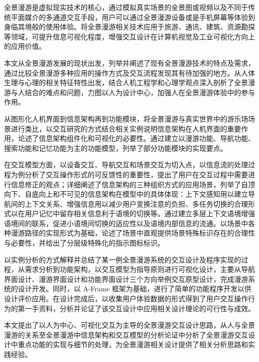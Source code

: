 \begin{cnabstract}
\begin{spacing}{1.0}
\xiaosi
\setlength{\baselineskip}{20pt}
全景漫游是虚拟现实技术的核心，通过模拟真实场景的全景图或视频以及不同于传统平面媒介的多通道交互手段，用户可以通过全景漫游设备或是手机屏幕等体验到身临其境般的使用体验。将全景漫游相关技术应用于旅游、通讯、建筑、资源勘探等领域，可提升信息可视化程度，增强交互设计在计算机视觉及工业可视化方向上的应用价值。

本文从全景漫游发展的现状出发，列举并阐述了现有全景漫游技术的特点及需求，通过比较全景漫游多种应用的操作方式及交互流程发现其有待加强的地方。从人体生理与心理的相关特征特性出发，结合人机工程学和心理学观点深入剖析了全景漫游与人结合的难点和问题，力图以人为设计中心，加强人在全景漫游体验中的参与作用。

从图形化人机界面到信息架构再到功能模块，将全景漫游与真实世界中的游乐场场景进行类比，以交互研究的方式结合相关实例说明信息架构在人机界面的重要作用，论述了信息架构组件化和可视化的必要性。通过建立以漫游功能、导航功能、搜索功能和记忆功能为主的功能模型，列举了部分功能模块的实现要点。

在交互模型方面，以设备交互、导航交互和场景交互为切入点，以信息流的处理过程为例分析了交互操作形式的可反馈性的重要性，提出了用户在交互过程中需要进行信息修正的观点；详细阐述了信息架构的三种组织方式的应用场景，列举了自顶向下、自底向上和不可见的信息架构在模型中的具体体现：上下文感知用以建立导航间的上下文关系、增强信息用以减少用户变换注意的负担、多任务切换的合理形式以在用户记忆中留存相关信息利于语境的切换等。通过建立多层上下文语境增强语境间的联系，促进小语境间切换的适应性以及语境内部信息的流通。以场景中各种漫游路径的实现形式为基础，论述了场景中直观提供场景特殊标识存在的合理性与必要性，并给出了分层级特殊化的指示图标标识。

以实例分析的方式解释并总结了某一例全景漫游系统的交互设计及程序实现的过程，从需求分析到功能架构，以交互模型为指导原则进行可视化设计，主要从导航界面设计、漫游界面设计和功能界面设计三个方向举例交互原型设计，完成漫游系统的设计开发。同时，以 A-Frame 框架为基础，进行了简单的功能程序开发以供设计评价应用。在设计完成后，以收集用户体验数据的形式得到了用户交互操作行为的第一手资料，分析并论证了该交互设计中应用相关设计理论的可行性与成效。

本文提出了以人为中心、可视化交互为主导的全景漫游交互设计思路，从人与全景漫游的关系至全景漫游中信息架构和交互模型的分析论证中分析了全景漫游交互设计中重点功能的实现与细节的处理，为全景漫游相关设计提供了相关分析思路和实践经验。

\end{spacing}
\end{cnabstract}


